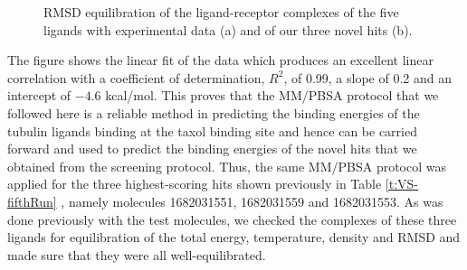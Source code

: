 \documentclass[11pt]{report}
\begin{document}
\begin{figure}
\centering
{}
\caption[RMSD equilibration]{RMSD equilibration
of the ligand-receptor complexes of the five ligands with experimental data (a)
and of our three novel hits (b).}
\label{f:VS-rmsd}
\end{figure}
The figure shows the linear fit of the data which produces an excellent linear correlation with a coefficient of determination, $R^{2}$, of 0.99, a slope of 0.2 and an
intercept of $-4.6$ kcal/mol.
This proves that the MM/PBSA protocol that we followed here
is a reliable method in predicting the binding energies of the tubulin ligands binding at the taxol binding site and hence can be
carried forward and used to predict the binding energies of the novel hits that we obtained from the screening protocol. Thus, the same MM/PBSA protocol was applied for the three highest-scoring hits shown previously in 
Table \ref{t:VS-fifthRun} , namely molecules 1682031551, 1682031559 and 1682031553. As was done previously with the test molecules, we checked the complexes of these three ligands for equilibration of the total energy, temperature, density and RMSD and made sure that they were all well-equilibrated.
\end{document}
